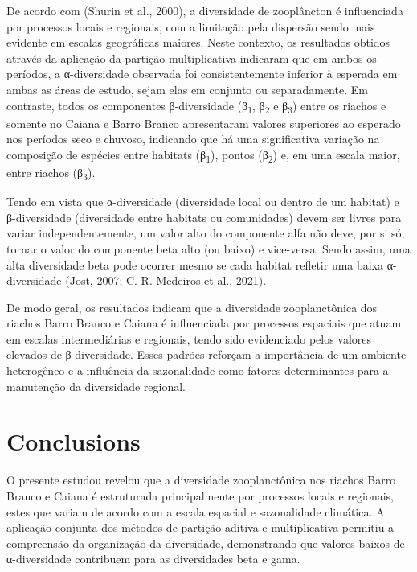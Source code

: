 \documentclass[
  letterpaper,
  DIV=11,
  numbers=noendperiod]{scrartcl}
\begin{document}
De acordo com (Shurin et al., 2000), a diversidade de zooplâncton é
influenciada por processos locais e regionais, com a limitação pela
dispersão sendo mais evidente em escalas geográficas maiores. Neste
contexto, os resultados obtidos através da aplicação da partição
multiplicativa indicaram que em ambos os períodos, a α-diversidade
observada foi consistentemente inferior à esperada em ambas as áreas de
estudo, sejam elas em conjunto ou separadamente. Em contraste, todos os
componentes β-diversidade (β\textsubscript{1}, β\textsubscript{2} e
β\textsubscript{3}) entre os riachos e somente no Caiana e Barro Branco
apresentaram valores superiores ao esperado nos períodos seco e chuvoso,
indicando que há uma significativa variação na composição de espécies
entre habitats (β\textsubscript{1}), pontos (β\textsubscript{2}) e, em
uma escala maior, entre riachos (β\textsubscript{3}).

Tendo em vista que α-diversidade (diversidade local ou dentro de um
habitat) e β-diversidade (diversidade entre habitats ou comunidades)
devem ser livres para variar independentemente, um valor alto do
componente alfa não deve, por si só, tornar o valor do componente beta
alto (ou baixo) e vice-versa. Sendo assim, uma alta diversidade beta
pode ocorrer mesmo se cada habitat refletir uma baixa α-diversidade
(Jost, 2007; C. R. Medeiros et al., 2021).

De modo geral, os resultados indicam que a diversidade zooplanctônica
dos riachos Barro Branco e Caiana é influenciada por processos espaciais
que atuam em escalas intermediárias e regionais, tendo sido evidenciado
pelos valores elevados de β-diversidade. Esses padrões reforçam a
importância de um ambiente heterogêneo e a influência da sazonalidade
como fatores determinantes para a manutenção da diversidade regional.

\section*{Conclusions}\label{conclusions}

O presente estudou revelou que a diversidade zooplanctônica nos riachos
Barro Branco e Caiana é estruturada principalmente por processos locais
e regionais, estes que variam de acordo com a escala espacial e
sazonalidade climática. A aplicação conjunta dos métodos de partição
aditiva e multiplicativa permitiu a compreensão da organização da
diversidade, demonstrando que valores baixos de α-diversidade contribuem
para as diversidades beta e gama.
\end{document}

